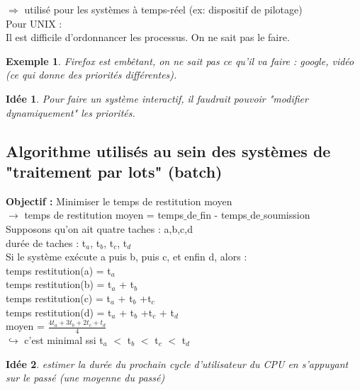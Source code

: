 \documentclass[12pt,a4paper]{report}
\newtheorem*{ex}{Exemple}
\newtheorem*{id}{Idée}
\begin{document}
$\Rightarrow$ utilisé pour les systèmes à temps-réel (ex: dispositif de pilotage)\\

Pour UNIX : \\
Il est difficile d'ordonnancer les processus. On ne sait pas le faire.\\ 
\begin{ex}Firefox est embêtant, on ne sait pas ce qu'il va faire : google, vidéo (ce qui donne des priorités différentes).\end{ex}

\begin{id} Pour faire un système interactif, il faudrait pouvoir "modifier dynamiquement" les priorités.\end{id}

\subsection{Algorithme utilisés au sein des systèmes de "traitement par lots" (batch)}
\textbf{Objectif :} Minimiser le temps de restitution moyen\\
$\rightarrow$ temps de restitution moyen = temps$\_$de$\_$fin - temps$\_$de$\_$soumission\\

Supposons qu'on ait quatre taches : a,b,c,d\\
durée de taches : t$_a$, t$_b$, t$_c$, t$_d$\\
Si le système exécute a puis b, puis c, et enfin d, alors : \\
\hspace*{1cm} temps restitution(a) = t$_a$\\
\hspace*{1cm} temps restitution(b) = t$_a$ + t$_b$\\
\hspace*{1cm} temps restitution(c) = t$_a$ + t$_b$ +t$_c$\\
\hspace*{1cm} temps restitution(d) = t$_a$ + t$_b$ +t$_c$ + t$_d$\\
\hspace*{2cm} moyen = $\frac{4t_a + 3t_b + 2t_c + t_d}{4}$\\
\hspace*{2.5cm} $\hookrightarrow$ c'est minimal ssi t$_a$ $<$ t$_b$ $<$ t$_c$ $<$ t$_d$\\

\begin{id}estimer la durée du prochain cycle d'utilisateur du CPU en s'appuyant sur le passé (une moyenne du passé)\end{id}
\end{document}
